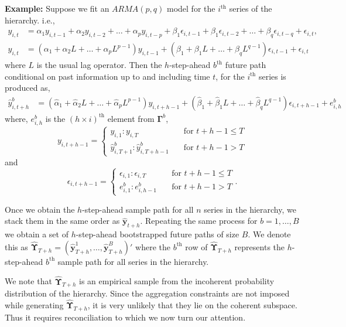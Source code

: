 \documentclass[12pt]{article}
\theoremstyle{definition}
\begin{document}
\noindent
\textbf{Example:}
Suppose we fit an $ARMA(p,q)$ model for the $i^\text{th}$ series of the hierarchy. i.e.,
\begin{align*}
	y_{i,t} &= \alpha_1y_{i,t-1} + \alpha_2y_{i,t-2}+\dots+\alpha_py_{i,t-p} + \beta_1\epsilon_{i,t-1} + \beta_1\epsilon_{i,t-2}+\dots+\beta_q\epsilon_{i,t-q} + \epsilon_{i,t},\\
	y_{i,t} &= (\alpha_1 + \alpha_2L+\dots+\alpha_pL^{p-1})y_{i,t-1} + (\beta_1 + \beta_1L+\dots+\beta_qL^{q-1})\epsilon_{i,t-1} + \epsilon_{i,t}
\end{align*}
where $L$ is the usual lag operator. Then the $h$-step-ahead $b^\text{th}$ future path conditional on past information up to and including time $t$, for the $i^\text{th}$ series is produced as,
\begin{align*}
	\hat{y}^b_{i,t+h} &= (\hat{\alpha}_1 + \hat{\alpha}_2L +\dots+ \hat{\alpha}_pL^{p-1})y_{i,t+h-1} + (\hat{\beta}_1 + \hat{\beta}_1L+\dots+\hat{\beta}_qL^{q-1})\epsilon_{i,t+h-1} + e^b_{i,h}
\end{align*}
where, $e^b_{i,h}$ is the $(h\times i)^\text{th}$ element from $\bm{\Gamma}^b$,
\begin{equation*}
	y_{i,t+h-1} =
	\begin{cases}
		y_{i,1}:y_{i,T}       & \quad \text{for } t+h-1 \le T\\
		\hat{y}^b_{i,T+1}:\hat{y}^b_{i,T+h-1}  & \quad \text{for } t+h-1 > T
	\end{cases}
\end{equation*}
and
\begin{equation*}
	\epsilon_{i,t+h-1} =
	\begin{cases}
		\epsilon_{i,1}:\epsilon_{i,T}       & \quad \text{for } t+h-1 \le T\\
		e^b_{i,1}:e^b_{i,h-1}  & \quad \text{for } t+h-1 > T
	\end{cases}.
\end{equation*}

Once we obtain the $h$-step-ahead sample path for all $n$ series in the hierarchy, we stack them in the same order as $\hat{\bm{y}}_{t+h}$. Repeating the same process for $b = 1,\dots,B$ we obtain a set of $h$-step-ahead bootstrapped future paths of size $B$. We denote this as $\hat{\bm{\Upsilon}}_{T+h} = (\hat{\bm{y}}^1_{T+h},\dots,\hat{\bm{y}}^B_{T+h})'$ where the $b^\text{th}$ row of $\hat{\bm{\Upsilon}}_{T+h}$ represents the $h$-step-ahead $b^\text{th}$ sample path for all series in the hierarchy.

We note that $\hat{\bm{\Upsilon}}_{T+h}$ is an empirical sample from the incoherent probability distribution of the hierarchy. Since the aggregation constraints are not imposed while generating $\hat{\bm{\Upsilon}}_{T+h}$, it is very unlikely that they lie on the coherent subspace. Thus it requires reconciliation to which we now turn our attention.
\end{document}
